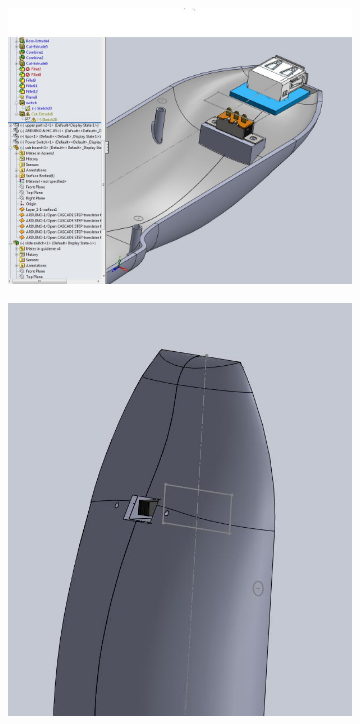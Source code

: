\FloatBarrier

\begin{figure}[!htbp]
    \centering
    \begin{subfigure}[m]{.6\linewidth}
        \centering
        \includegraphics[width=\linewidth]{assets/conception1/img223.jpg}
    \end{subfigure}
    \hfill
    \begin{subfigure}{.3\linewidth}
        \centering
        \includegraphics[width=\linewidth]{assets/conception1/img224.jpg}
    \end{subfigure}
\end{figure}

